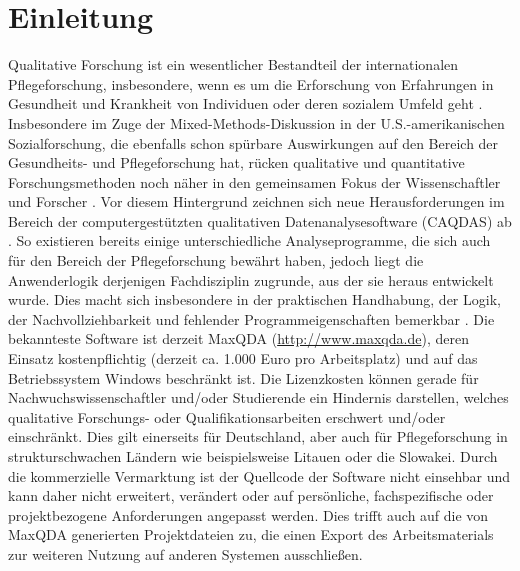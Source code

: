\chapter{Einleitung}

Qualitative Forschung ist ein wesentlicher Bestandteil der internationalen Pflegeforschung,
insbesondere, wenn es um die Erforschung von Erfahrungen in Gesundheit und Krankheit von
Individuen oder deren sozialem Umfeld geht \cite{lobiondo05}. Insbesondere im
Zuge der Mixed-Methods-Diskussion in der U.S.-amerikanischen Sozialforschung, die ebenfalls
schon spürbare Auswirkungen auf den Bereich der Gesundheits- und Pflegeforschung hat, rücken
qualitative und quantitative Forschungsmethoden noch näher in den gemeinsamen Fokus der
Wissenschaftler und Forscher \cite{teddlie08}. Vor diesem Hintergrund zeichnen sich
neue Herausforderungen im Bereich der computergestützten qualitativen Datenanalysesoftware
(CAQDAS) ab \cite{kuckartz07}. So existieren bereits einige unterschiedliche Analyseprogramme,
die sich auch für den Bereich der Pflegeforschung bewährt haben, jedoch liegt die Anwenderlogik
derjenigen Fachdisziplin zugrunde, aus der sie heraus entwickelt wurde. Dies macht sich
insbesondere in der praktischen Handhabung, der Logik, der Nachvollziehbarkeit und fehlender
Programmeigenschaften bemerkbar \cite{lewins07, helfferich05}. Die bekannteste
Software ist derzeit MaxQDA (\url{http://www.maxqda.de}), deren Einsatz kostenpflichtig (derzeit ca.
1.000 Euro pro Arbeitsplatz) und auf das Betriebssystem Windows beschränkt ist. Die Lizenzkosten
können gerade für Nachwuchswissenschaftler und/oder Studierende ein Hindernis darstellen,
welches qualitative Forschungs- oder Qualifikationsarbeiten erschwert und/oder einschränkt. Dies
gilt einerseits für Deutschland, aber auch für Pflegeforschung in strukturschwachen Ländern wie
beispielsweise Litauen oder die Slowakei.
Durch die kommerzielle Vermarktung ist der Quellcode der Software nicht einsehbar und kann 
daher nicht erweitert, verändert oder auf persönliche, fachspezifische oder projektbezogene Anforderungen angepasst werden. 
Dies trifft auch auf die von MaxQDA generierten Projektdateien zu, die einen Export des Arbeitsmaterials zur weiteren Nutzung 
auf anderen Systemen ausschließen.
